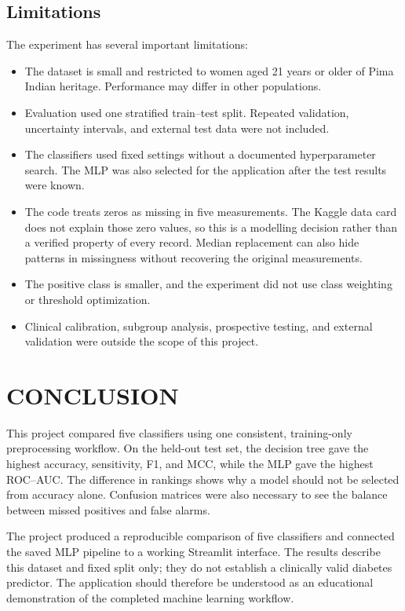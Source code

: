 \documentclass[pdflatex,sn-vancouver-num]{sn-jnl}
\begin{document}
\subsection{Limitations}\label{subsec:limitations}

The experiment has several important limitations:

\begin{itemize}
    \item The dataset is small and restricted to women aged 21 years or older of Pima Indian heritage. Performance may differ in other populations.
    \item Evaluation used one stratified train--test split. Repeated validation, uncertainty intervals, and external test data were not included.
    \item The classifiers used fixed settings without a documented hyperparameter search. The MLP was also selected for the application after the test results were known.
    \item The code treats zeros as missing in five measurements. The Kaggle data card does not explain those zero values, so this is a modelling decision rather than a verified property of every record. Median replacement can also hide patterns in missingness without recovering the original measurements.
    \item The positive class is smaller, and the experiment did not use class weighting or threshold optimization.
    \item Clinical calibration, subgroup analysis, prospective testing, and external validation were outside the scope of this project.
\end{itemize}

\FloatBarrier
\section{CONCLUSION}\label{sec:conclusion}

This project compared five classifiers using one consistent, training-only preprocessing workflow. On the held-out test set, the decision tree gave the highest accuracy, sensitivity, F1, and MCC, while the MLP gave the highest ROC--AUC. The difference in rankings shows why a model should not be selected from accuracy alone. Confusion matrices were also necessary to see the balance between missed positives and false alarms.

The project produced a reproducible comparison of five classifiers and connected the saved MLP pipeline to a working Streamlit interface. The results describe this dataset and fixed split only; they do not establish a clinically valid diabetes predictor. The application should therefore be understood as an educational demonstration of the completed machine learning workflow.

\backmatter

\clearpage
{}
{}

\end{document}
